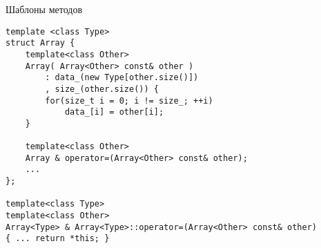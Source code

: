 \documentclass{beamer}
\begin{document}
\begin{frame}[fragile]{Шаблоны методов}
\small
    \begin{lstlisting}
template <class Type> 
struct Array {
    template<class Other>
    Array( Array<Other> const& other )
        : data_(new Type[other.size()])
        , size_(other.size()) {
        for(size_t i = 0; i != size_; ++i)
            data_[i] = other[i];
    }

    template<class Other>
    Array & operator=(Array<Other> const& other);
    ...
};

template<class Type>
template<class Other>
Array<Type> & Array<Type>::operator=(Array<Other> const& other)
{ ... return *this; }
    \end{lstlisting}
\end{frame}
\end{document}
